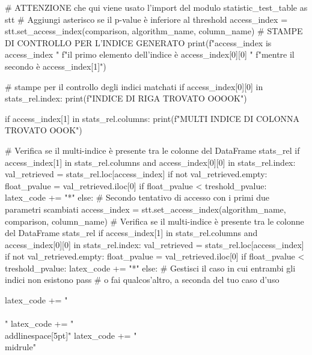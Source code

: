 \begin{itemize}
{                # ATTENZIONE che qui viene usato l'import del modulo statistic_test_table as stt
                # Aggiungi asterisco se il p-value è inferiore al threshold
                access_index = stt.set_access_index(comparison, algorithm_name, column_name)
                # STAMPE DI CONTROLLO PER L'INDICE GENERATO
                print(f"access_index is {access_index} \n "
                      f"il primo elemento dell'indice è {access_index[0][0]} \n "
                      f"mentre il secondo è {access_index[1]}")

                # stampe per il controllo degli indici matchati
                if access_index[0][0] in stats_rel.index:
                    print(f"INDICE DI RIGA TROVATO OOOOK")

                if access_index[1] in stats_rel.columns:
                    print(f"MULTI INDICE DI COLONNA TROVATO OOOK")

                # Verifica se il multi-indice è presente tra le colonne del DataFrame stats_rel
                if access_index[1] in stats_rel.columns and access_index[0][0] in stats_rel.index:
                    val_retrieved = stats_rel.loc[access_index]
                    if not val_retrieved.empty:
                        float_pvalue = val_retrieved.iloc[0]
                        if float_pvalue < treshold_pvalue:
                            latex_code += "*"
                else:
                    # Secondo tentativo di accesso con i primi due parametri scambiati
                    access_index = stt.set_access_index(algorithm_name, comparison, column_name)
                    # Verifica se il multi-indice è presente tra le colonne del DataFrame stats_rel
                    if access_index[1] in stats_rel.columns and access_index[0][0] in stats_rel.index:
                        val_retrieved = stats_rel.loc[access_index]
                        if not val_retrieved.empty:
                            float_pvalue = val_retrieved.iloc[0]
                            if float_pvalue < treshold_pvalue:
                                latex_code += "*"
                    else:
                        # Gestisci il caso in cui entrambi gli indici non esistono
                        pass  # o fai qualcos'altro, a seconda del tuo caso d'uso

            latex_code += " \\\\\n"
            latex_code += "\\addlinespace[5pt]\n"
            latex_code += "\\midrule\n"

}
\end{itemize}
